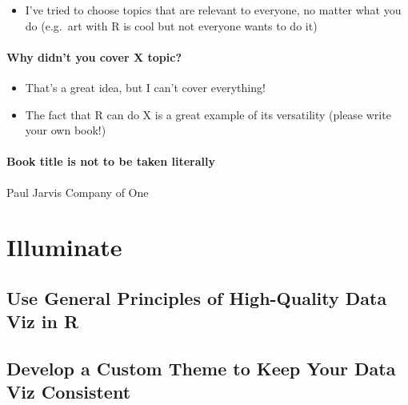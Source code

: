 \documentclass[
]{book}
\providecommand{\tightlist}{%
  \setlength{\itemsep}{0pt}\setlength{\parskip}{0pt}}
\begin{document}
\begin{itemize}
\tightlist
\item
  I've tried to choose topics that are relevant to everyone, no matter what you do (e.g.~art with R is cool but not everyone wants to do it)
\end{itemize}

\hypertarget{why-didnt-you-cover-x-topic}{%
\subsection*{Why didn't you cover X topic?}\label{why-didnt-you-cover-x-topic}}

\begin{itemize}
\tightlist
\item
  That's a great idea, but I can't cover everything!
\item
  The fact that R can do X is a great example of its versatility (please write your own book!)
\end{itemize}

\hypertarget{book-title-is-not-to-be-taken-literally}{%
\subsection*{Book title is not to be taken literally}\label{book-title-is-not-to-be-taken-literally}}

Paul Jarvis Company of One

\hypertarget{part-illuminate}{%
\part*{Illuminate}\label{part-illuminate}}

\hypertarget{use-general-principles-of-high-quality-data-viz-in-r}{%
\chapter*{Use General Principles of High-Quality Data Viz in R}\label{use-general-principles-of-high-quality-data-viz-in-r}}

\hypertarget{develop-a-custom-theme-to-keep-your-data-viz-consistent}{%
\chapter*{Develop a Custom Theme to Keep Your Data Viz Consistent}\label{develop-a-custom-theme-to-keep-your-data-viz-consistent}}
\end{document}
